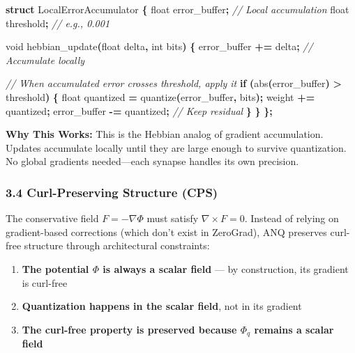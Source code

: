 \documentclass[
  11pt,
  a4paper,
]{article}
\newenvironment{Shaded}{\begin{snugshade}}{\end{snugshade}}
\newcommand{\CommentTok}[1]{\textcolor[rgb]{0.56,0.35,0.01}{\textit{#1}}}
\newcommand{\ControlFlowTok}[1]{\textcolor[rgb]{0.13,0.29,0.53}{\textbf{#1}}}
\newcommand{\DataTypeTok}[1]{\textcolor[rgb]{0.13,0.29,0.53}{#1}}
\newcommand{\KeywordTok}[1]{\textcolor[rgb]{0.13,0.29,0.53}{\textbf{#1}}}
\newcommand{\NormalTok}[1]{#1}
\newcommand{\OperatorTok}[1]{\textcolor[rgb]{0.81,0.36,0.00}{\textbf{#1}}}
\providecommand{\tightlist}{%
  \setlength{\itemsep}{0pt}\setlength{\parskip}{0pt}}
\begin{document}
\begin{Shaded}
\begin{Highlighting}[]
\KeywordTok{struct}\NormalTok{ LocalErrorAccumulator }\OperatorTok{\{}
    \DataTypeTok{float}\NormalTok{ error\_buffer}\OperatorTok{;}        \CommentTok{// Local accumulation}
    \DataTypeTok{float}\NormalTok{ threshold}\OperatorTok{;}           \CommentTok{// e.g., 0.001}
    
    \DataTypeTok{void}\NormalTok{ hebbian\_update}\OperatorTok{(}\DataTypeTok{float}\NormalTok{ delta}\OperatorTok{,} \DataTypeTok{int}\NormalTok{ bits}\OperatorTok{)} \OperatorTok{\{}
\NormalTok{        error\_buffer }\OperatorTok{+=}\NormalTok{ delta}\OperatorTok{;}  \CommentTok{// Accumulate locally}
        
        \CommentTok{// When accumulated error crosses threshold, apply it}
        \ControlFlowTok{if} \OperatorTok{(}\NormalTok{abs}\OperatorTok{(}\NormalTok{error\_buffer}\OperatorTok{)} \OperatorTok{\textgreater{}}\NormalTok{ threshold}\OperatorTok{)} \OperatorTok{\{}
            \DataTypeTok{float}\NormalTok{ quantized }\OperatorTok{=}\NormalTok{ quantize}\OperatorTok{(}\NormalTok{error\_buffer}\OperatorTok{,}\NormalTok{ bits}\OperatorTok{);}
\NormalTok{            weight }\OperatorTok{+=}\NormalTok{ quantized}\OperatorTok{;}
\NormalTok{            error\_buffer }\OperatorTok{{-}=}\NormalTok{ quantized}\OperatorTok{;}  \CommentTok{// Keep residual}
        \OperatorTok{\}}
    \OperatorTok{\}}
\OperatorTok{\};}
\end{Highlighting}
\end{Shaded}

\textbf{Why This Works:} This is the Hebbian analog of gradient
accumulation. Updates accumulate locally until they are large enough to
survive quantization. No global gradients needed---each synapse handles
its own precision.

\subsubsection{3.4 Curl-Preserving Structure
(CPS)}\label{curl-preserving-structure-cps}

The conservative field \(F = -\nabla\Phi\) must satisfy
\(\nabla \times F = 0\). Instead of relying on gradient-based
corrections (which don't exist in ZeroGrad), ANQ preserves curl-free
structure through architectural constraints:

\begin{enumerate}
\def\labelenumi{\arabic{enumi}.}
\tightlist
\item
  \textbf{The potential \(\Phi\) is always a scalar field} --- by
  construction, its gradient is curl-free
\item
  \textbf{Quantization happens in the scalar field}, not in its gradient
\item
  \textbf{The curl-free property is preserved because \(\Phi_q\) remains
  a scalar field}
\end{enumerate}
\end{document}
